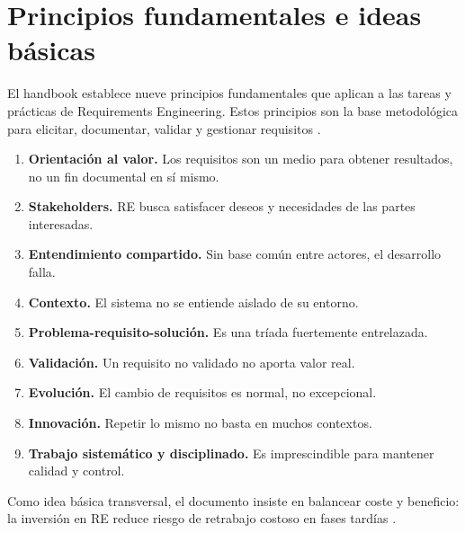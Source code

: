 \section{Principios fundamentales e ideas b\'asicas}
El handbook establece nueve principios fundamentales que aplican a las tareas y pr\'acticas de Requirements Engineering. Estos principios son la base metodol\'ogica para elicitar, documentar, validar y gestionar requisitos \cite[p.~16]{cpre}.

\begin{enumerate}[leftmargin=1.2em]
  \item \textbf{Orientaci\'on al valor.} Los requisitos son un medio para obtener resultados, no un fin documental en s\'i mismo.
  \item \textbf{Stakeholders.} RE busca satisfacer deseos y necesidades de las partes interesadas.
  \item \textbf{Entendimiento compartido.} Sin base com\'un entre actores, el desarrollo falla.
  \item \textbf{Contexto.} El sistema no se entiende aislado de su entorno.
  \item \textbf{Problema-requisito-soluci\'on.} Es una tr\'iada fuertemente entrelazada.
  \item \textbf{Validaci\'on.} Un requisito no validado no aporta valor real.
  \item \textbf{Evoluci\'on.} El cambio de requisitos es normal, no excepcional.
  \item \textbf{Innovaci\'on.} Repetir lo mismo no basta en muchos contextos.
  \item \textbf{Trabajo sistem\'atico y disciplinado.} Es imprescindible para mantener calidad y control.
\end{enumerate}

Como idea b\'asica transversal, el documento insiste en balancear coste y beneficio: la inversi\'on en RE reduce riesgo de retrabajo costoso en fases tard\'ias \cite[pp.~16--18]{cpre}.
